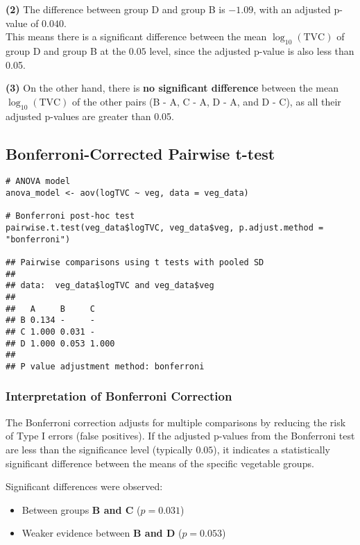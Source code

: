 \documentclass{article}
\begin{document}
\vspace{1em}

\noindent
\textbf{(2)} The difference between group D and group B is $-1.09$, with an adjusted p-value of $0.040$. \\
This means there is a significant difference between the mean $\log_{10}(\text{TVC})$ of group D and group B at the $0.05$ level, since the adjusted p-value is also less than 0.05.

\vspace{1em}

\noindent
\textbf{(3)} On the other hand, there is \textbf{no significant difference} between the mean $\log_{10}(\text{TVC})$ of the other pairs (B - A, C - A, D - A, and D - C), as all their adjusted p-values are greater than 0.05.




\subsection*{Bonferroni-Corrected Pairwise t-test}

\begin{verbatim}
# ANOVA model
anova_model <- aov(logTVC ~ veg, data = veg_data)

# Bonferroni post-hoc test
pairwise.t.test(veg_data$logTVC, veg_data$veg, p.adjust.method = "bonferroni")

## Pairwise comparisons using t tests with pooled SD
##
## data:  veg_data$logTVC and veg_data$veg
##
##   A     B     C
## B 0.134 -     -
## C 1.000 0.031 -
## D 1.000 0.053 1.000
##
## P value adjustment method: bonferroni
\end{verbatim}

\subsubsection*{Interpretation of Bonferroni Correction}
The Bonferroni correction adjusts for multiple comparisons by reducing the risk of Type I errors (false positives). If the adjusted p-values from the Bonferroni test are less than the significance level (typically $0.05$), it indicates a statistically significant difference between the means of the specific vegetable groups.

Significant differences were observed:
\begin{itemize}
    \item Between groups \textbf{B and C} ($p = 0.031$)
    \item Weaker evidence between \textbf{B and D} ($p = 0.053$)
\end{itemize}
\end{document}
